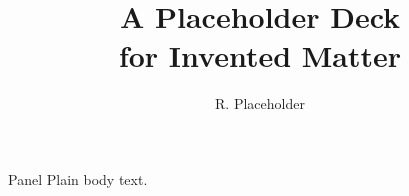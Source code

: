 \documentclass[10pt,aspectratio=169]{beamer}
\title{A Placeholder Deck\\for Invented Matter}
\author{R. Placeholder}
\date{}
\begin{document}
\begin{frame}[plain]
  \titlepage
\end{frame}
\begin{frame}{Panel}
Plain body text.
\end{frame}
\end{document}
